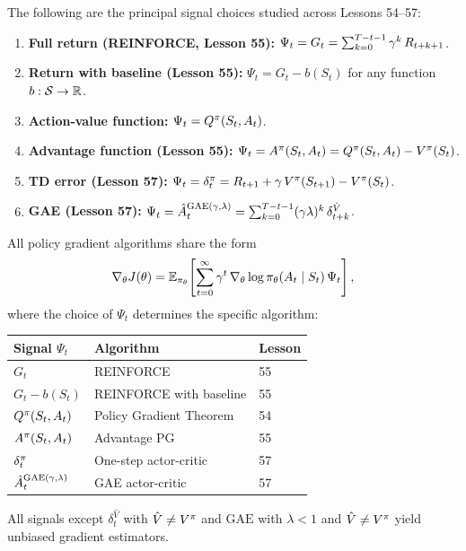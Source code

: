 \documentclass[11pt,a4paper]{article}
\begin{document}
\begin{definition}
\label{def:signal-choices}
The following are the principal signal choices studied across
Lessons 54--57:
\begin{enumerate}[label=(\roman*)]
  \item \textbf{Full return (REINFORCE, Lesson 55):}
    $\Psi_t = G_t = \sum_{k=0}^{T-t-1} \gamma^k\, R_{t+k+1}$.
  \item \textbf{Return with baseline (Lesson 55):}
    $\Psi_t = G_t - b(S_t)$ for any function $b : \mathcal{S} \to \mathbb{R}$.
  \item \textbf{Action-value function:}
    $\Psi_t = Q^{\pi}(S_t, A_t)$.
  \item \textbf{Advantage function (Lesson 55):}
    $\Psi_t = A^\pi(S_t, A_t) = Q^{\pi}(S_t, A_t) - V^{\pi}(S_t)$.
  \item \textbf{TD error (Lesson 57):}
    $\Psi_t = \delta_t^\pi = R_{t+1} + \gamma\, V^{\pi}(S_{t+1})
    - V^{\pi}(S_t)$.
  \item \textbf{GAE (Lesson 57):}
    $\Psi_t = \hat{A}_t^{\mathrm{GAE}(\gamma,\lambda)}
    = \sum_{k=0}^{T-t-1} (\gamma\lambda)^k\, \delta_{t+k}^{\hat{V}}$.
\end{enumerate}
\end{definition}

\begin{keyresult}[title={Unified Policy Gradient Equation}]
\label{kr:unified}
All policy gradient algorithms share the form
\[
  \nabla_\theta J(\theta) = \mathbb{E}_{\pi_\theta}\!\left[
  \sum_{t=0}^{\infty} \gamma^t\,
  \nabla_\theta \log \pi_\theta(A_t \mid S_t)\, \Psi_t\right],
\]
where the choice of $\Psi_t$ determines the specific algorithm:
\begin{center}
\begin{tabular}{lll}
\toprule
\textbf{Signal $\Psi_t$} & \textbf{Algorithm} & \textbf{Lesson} \\
\midrule
$G_t$ & REINFORCE & 55 \\
$G_t - b(S_t)$ & REINFORCE with baseline & 55 \\
$Q^{\pi}(S_t, A_t)$ & Policy Gradient Theorem & 54 \\
$A^\pi(S_t, A_t)$ & Advantage PG & 55 \\
$\delta_t^\pi$ & One-step actor-critic & 57 \\
$\hat{A}_t^{\mathrm{GAE}(\gamma,\lambda)}$ & GAE actor-critic & 57 \\
\bottomrule
\end{tabular}
\end{center}
All signals except $\delta_t^{\hat{V}}$ with $\hat{V} \neq V^{\pi}$
and $\mathrm{GAE}$ with $\lambda < 1$ and $\hat{V} \neq V^{\pi}$ yield
unbiased gradient estimators.
\end{keyresult}
\end{document}
